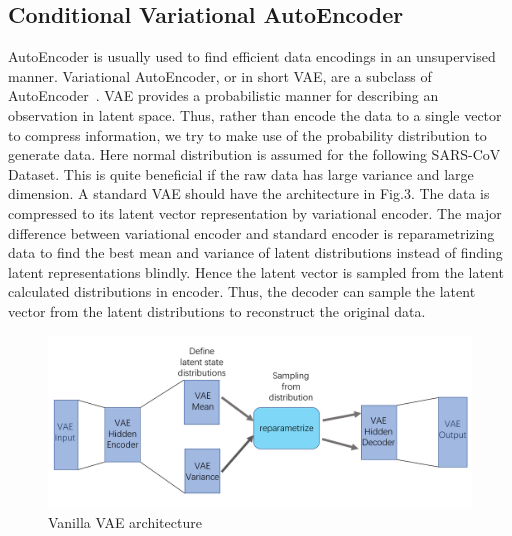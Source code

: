 \subsection{Conditional Variational AutoEncoder}
AutoEncoder is usually used to find efficient data encodings in an unsupervised manner. Variational AutoEncoder, or in short VAE, are a subclass of AutoEncoder~\cite{vae2020}. VAE provides a probabilistic manner for describing an observation in latent space. Thus, rather than encode the data to a single vector to compress information, we try to make use of the probability distribution to generate data. Here normal distribution is assumed for the following SARS-CoV Dataset. This is quite beneficial if the raw data has large variance and large dimension. A standard VAE should have the architecture in Fig.3. The data is compressed to its latent vector representation by variational encoder. The major difference between variational encoder and standard encoder is reparametrizing data to find the best mean and variance of latent distributions instead of finding latent representations blindly. Hence the latent vector is sampled from the latent calculated distributions in encoder. Thus, the decoder can sample the latent vector from the latent distributions to reconstruct the original data.\\
\begin{figure}[hbt!]
\centering
\includegraphics[width=\textwidth]{images/reimg3.png}  
\caption{Vanilla VAE architecture}
\label{figure3}  
\end{figure}

